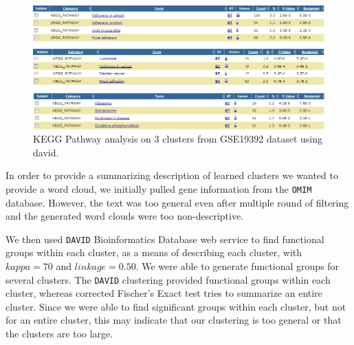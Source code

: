 \documentclass[aps,prd,final,onecolumn,a4paper,10pt]{revtex4}
\begin{document}
\begin{figure}[H]
\centering
\includegraphics[scale=0.65]{3Clusters_PathwayCombined.png}
\caption{KEGG Pathway analysis on 3 clusters from GSE19392 dataset using david.}
\label{fig:KEGGPathway.}
\end{figure}



In order to provide a summarizing description of learned clusters we wanted to provide a word cloud, we initially pulled gene information from the \verb!OMIM! database. However, the text was too general even after multiple round of filtering and the generated word clouds were too non-descriptive.

We then used \verb!DAVID! Bioinformatics Database web service to find functional groups within each cluster, as a means of describing each cluster, with $kappa=70$ and $linkage = 0.50$. We were able to generate functional groups for several clusters.
The \verb!DAVID! clustering provided functional groups within each cluster, whereas corrected Fischer's Exact test tries to summarize an entire cluster. Since we were able to find significant groups within each cluster, but not for an entire cluster, this may indicate that our clustering is too general or that the clusters are too large.

\begin{figure}[h]

\end{figure}
\end{document}
